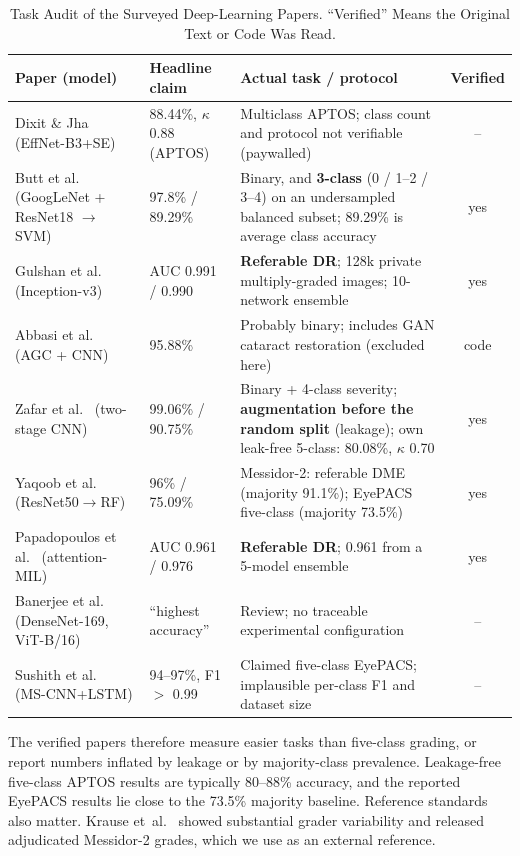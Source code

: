 \documentclass[journal]{IEEEtran}
\begin{document}
\begin{table}[!t]
\caption{Task Audit of the Surveyed Deep-Learning Papers. ``Verified'' Means the Original Text or
Code Was Read.}
\label{tab:audit}
\centering
\footnotesize
\begin{tabular}{@{}p{3.6cm}p{2.5cm}p{8.4cm}c@{}}
\toprule
Paper (model) & Headline claim & Actual task / protocol & Verified \\
\midrule
Dixit \& Jha~\cite{dixit2025effnet} (EffNet-B3+SE) & 88.44\%, $\kappa$ 0.88 (APTOS) & Multiclass APTOS; class count and protocol not verifiable (paywalled) & -- \\
Butt et al.~\cite{butt2022hybrid} (GoogLeNet + ResNet18 $\rightarrow$ SVM) & 97.8\% / 89.29\% & Binary, and \textbf{3-class} (0 / 1--2 / 3--4) on an undersampled balanced subset; 89.29\% is average class accuracy & yes \\
Gulshan et al.~\cite{gulshan2016development} (Inception-v3) & AUC 0.991 / 0.990 & \textbf{Referable DR}; 128k private multiply-graded images; 10-network ensemble & yes \\
Abbasi et al.~\cite{abbasi2025adaptive} (AGC + CNN) & 95.88\% & Probably binary; includes GAN cataract restoration (excluded here) & code \\
Zafar et al.~\cite{zafar2025lightweight} (two-stage CNN) & 99.06\% / 90.75\% & Binary + 4-class severity; \textbf{augmentation before the random split} (leakage); own leak-free 5-class: 80.08\%, $\kappa$ 0.70 & yes \\
Yaqoob et al.~\cite{yaqoob2021resnet} (ResNet50$\rightarrow$RF) & 96\% / 75.09\% & Messidor-2: referable DME (majority 91.1\%); EyePACS five-class (majority 73.5\%) & yes \\
Papadopoulos et al.~\cite{papadopoulos2021mil} (attention-MIL) & AUC 0.961 / 0.976 & \textbf{Referable DR}; 0.961 from a 5-model ensemble & yes \\
Banerjee et al.~\cite{banerjee2025review} (DenseNet-169, ViT-B/16) & ``highest accuracy'' & Review; no traceable experimental configuration & -- \\
Sushith et al.~\cite{sushith2025hybrid} (MS-CNN+LSTM) & 94--97\%, F1 $>$ 0.99 & Claimed five-class EyePACS; implausible per-class F1 and dataset size & -- \\
\bottomrule
\end{tabular}
\end{table}

The verified papers therefore measure easier tasks than five-class grading, or report numbers
inflated by leakage or by majority-class prevalence. Leakage-free five-class APTOS results are
typically 80--88\% accuracy, and the reported EyePACS results lie close to the 73.5\% majority
baseline. Reference standards also matter. Krause et~al.~\cite{krause2018grader} showed substantial
grader variability and released adjudicated Messidor-2 grades, which we use as an external reference.
\end{document}
